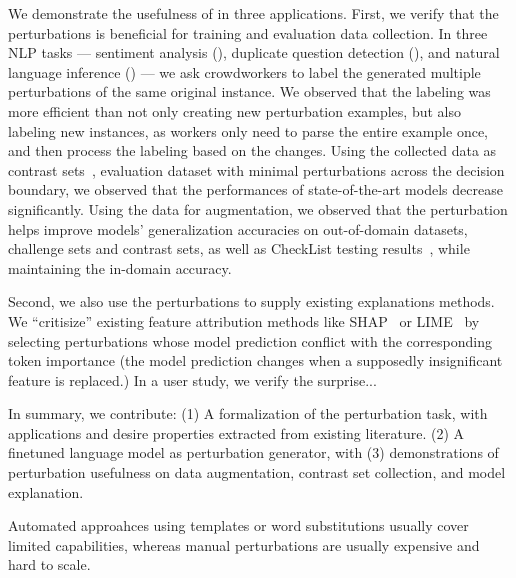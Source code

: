 We demonstrate the usefulness of \sysname in three applications. 
First, we verify that the perturbations is beneficial for training and evaluation data collection. 
In three NLP tasks --- sentiment analysis (\sst), duplicate question detection (\qqp), and natural language inference (\nli) --- we ask crowdworkers to label the generated multiple perturbations of the same original instance.
We observed that the labeling was more efficient than not only creating new perturbation examples, but also labeling new instances, as workers only need to parse the entire example once, and then process the labeling based on the changes.
Using the collected data as contrast sets~\cite{}, \ie evaluation dataset with minimal perturbations across the decision boundary, we observed that the performances of state-of-the-art models decrease significantly. 
Using the data for augmentation, we observed that the perturbation helps improve models' generalization accuracies on out-of-domain datasets, challenge sets and contrast sets, as well as CheckList testing results~\cite{checklist:acl20}, while maintaining the in-domain accuracy.

Second, we also use the perturbations to supply existing explanations methods.
We ``critisize'' existing feature attribution methods like SHAP~\cite{} or LIME~\cite{} by selecting perturbations whose model prediction conflict with the corresponding token importance (\eg the model prediction changes when a supposedly insignificant feature is replaced.)
In a user study, we verify the surprise...

In summary, we contribute: 
(1) A formalization of the perturbation task, with applications and desire properties extracted from existing literature.
(2) A finetuned language model as perturbation generator, with 
(3) demonstrations of perturbation usefulness on data augmentation, contrast set collection, and model explanation. 



Automated approahces using templates or word substitutions usually cover limited capabilities, whereas manual perturbations are usually expensive and hard to scale. 




